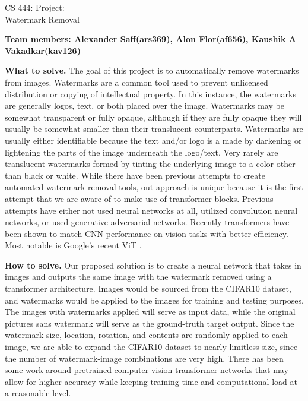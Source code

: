 \documentclass[11pt]{article}
\begin{document}
\begin{center}
\large{CS 444: Project:\\Watermark Removal}\\
\end{center}
\vspace{5mm}

\textbf{Team members: Alexander Saff(ars369), Alon Flor(af656), Kaushik A Vakadkar(kav126)}




\begin{sloppypar}
\textbf{What to solve.}
The goal of this project is to automatically remove watermarks from images. Watermarks are a common tool used to prevent unlicensed distribution or copying of intellectual property. In this instance, the watermarks are generally logos, text, or both placed over the image. Watermarks may be somewhat transparent or fully opaque, although if they are fully opaque they will usually be somewhat smaller than their translucent counterparts. Watermarks are usually either identifiable because the text and/or logo is a made by darkening or lightening the parts of the image underneath the logo/text. Very rarely are translucent watermarks formed by tinting the underlying image to a color other than black or white. While there have been previous attempts to create automated watermark removal tools, out approach is unique because it is the first attempt that we are aware of to make use of transformer blocks. \cite{transformer} Previous attempts have either not used neural networks at all, utilized convolution neural networks, or used generative adversarial networks. Recently transformers have been shown to match CNN performance on vision tasks with better efficiency. Most notable is Google's recent ViT \cite{dosovitskiy2020image}.
\end{sloppypar}

\begin{sloppypar}
\textbf{How to solve.} 
Our proposed solution is to create a neural network that takes in images and outputs the same image with the watermark removed using a transformer architecture. Images would be sourced from the CIFAR10 dataset, and watermarks would be applied to the images for training and testing purposes. The images with watermarks applied will serve as input data, while the original pictures sans watermark will serve as the ground-truth target output. Since the watermark size, location, rotation, and contents are randomly applied to each image, we are able to expand the CIFAR10 dataset to nearly limitless size, since the number of watermark-image combinations are very high. There has been some work around pretrained computer vision transformer networks that may allow for higher accuracy while keeping training time and computational load at a reasonable level. 
\end{sloppypar}
\end{document}
